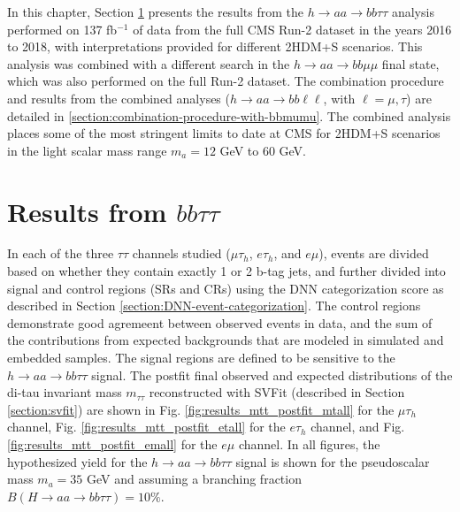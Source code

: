 In this chapter, Section \ref{section:bbtautau_results} presents the results from the $h \rightarrow aa \rightarrow bb\tau\tau$ analysis performed on 137 fb$^{-1}$ of data from the full CMS Run-2 dataset in the years 2016 to 2018, with interpretations provided for different 2HDM+S scenarios. This analysis was combined with a different search in the $h\rightarrow aa \rightarrow bb\mu\mu$ final state, which was also performed on the full Run-2 dataset. The combination procedure and results from the combined analyses ($h \rightarrow aa \rightarrow bb\ell\ell$, with $\ell = \mu, \tau$) are detailed in \ref{section:combination-procedure-with-bbmumu}. The combined analysis places some of the most stringent limits to date at CMS for 2HDM+S scenarios in the light scalar mass range $m_a = 12$ GeV to 60 GeV.

\section{Results from \texorpdfstring{$bb\tau\tau$}{bbtautau}}
\label{section:bbtautau_results}
In each of the three $\tau\tau$ channels studied ($\mu\tau_{h}$, $e\tau_{h}$, and $e\mu$), events are divided based on whether they contain exactly 1 or 2 b-tag jets, and further divided into signal and control regions (SRs and CRs) using the DNN categorization score as described in Section \ref{section:DNN-event-categorization}. The control regions demonstrate good agremeent between observed events in data, and the sum of the contributions from expected backgrounds that are modeled in simulated and embedded samples. The signal regions are defined to be sensitive to the $h \rightarrow aa \rightarrow bb\tau\tau$ signal. The postfit final observed and expected distributions of the di-tau invariant mass $m_{\tau\tau}$ reconstructed with SVFit (described in Section \ref{section:svfit}) are shown in Fig. \ref{fig:results_mtt_postfit_mtall} for the $\mu\tau_{h}$ channel, Fig. \ref{fig:results_mtt_postfit_etall} for the $e\tau_{h}$ channel, and Fig. \ref{fig:results_mtt_postfit_emall} for the $e\mu$ channel. In all figures, the hypothesized yield for the $h\rightarrow aa \rightarrow bb\tau\tau$ signal is shown for the pseudoscalar mass $m_a = 35$ GeV and assuming a branching fraction $B(H \rightarrow aa \rightarrow bb\tau\tau) = 10\%$.
